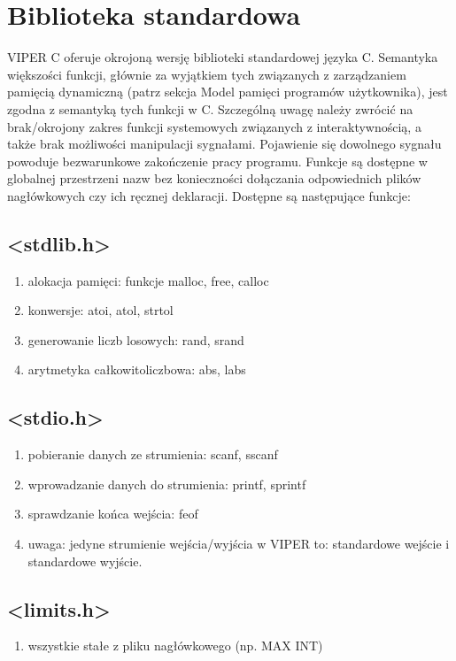 \documentclass[a4paper,twoside,openright,11pt]{report}
\begin{document}
  \chapter {Biblioteka standardowa}
  \par VIPER C oferuje okrojoną wersję biblioteki standardowej języka C. Semantyka większości funkcji, głównie za wyjątkiem tych związanych z zarządzaniem pamięcią dynamiczną (patrz sekcja Model pamięci programów użytkownika), jest zgodna z semantyką tych funkcji w C. Szczególną uwagę należy zwrócić na brak/okrojony zakres funkcji systemowych związanych z interaktywnością, a także brak możliwości manipulacji sygnałami. Pojawienie się dowolnego sygnału powoduje bezwarunkowe zakończenie pracy programu. Funkcje są dostępne w globalnej przestrzeni nazw bez konieczności dołączania odpowiednich plików nagłówkowych czy ich ręcznej deklaracji. Dostępne są następujące funkcje:

  \section {<stdlib.h>}
    \begin{enumerate}
      \item alokacja pamięci: funkcje malloc, free, calloc
      \item konwersje: atoi, atol, strtol
      \item generowanie liczb losowych: rand, srand
      \item arytmetyka całkowitoliczbowa: abs, labs
    \end{enumerate}
  \section {<stdio.h>}
    \begin{enumerate}
      \item pobieranie danych ze strumienia: scanf, sscanf
      \item wprowadzanie danych do strumienia: printf, sprintf
      \item sprawdzanie końca wejścia: feof
      \item uwaga: jedyne strumienie wejścia/wyjścia w VIPER to: standardowe wejście i standardowe wyjście.
    \end{enumerate}
  \section {<limits.h>}
    \begin{enumerate}
      \item wszystkie stałe z pliku nagłówkowego (np. MAX INT)
    \end{enumerate}
\end{document}
